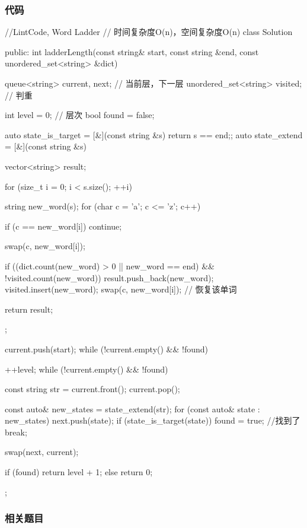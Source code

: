 \subsubsection{代码}
\begin{Code}
//LintCode, Word Ladder
// 时间复杂度O(n)，空间复杂度O(n)
class Solution {
public:
    int ladderLength(const string& start, const string &end,
            const unordered_set<string> &dict) {
        queue<string> current, next;    // 当前层，下一层
        unordered_set<string> visited;  // 判重

        int level = 0;  // 层次
        bool found = false;

        auto state_is_target = [&](const string &s) {return s == end;};
        auto state_extend = [&](const string &s) {
            vector<string> result;

            for (size_t i = 0; i < s.size(); ++i) {
                string new_word(s);
                for (char c = 'a'; c <= 'z'; c++) {
                    if (c == new_word[i]) continue;

                    swap(c, new_word[i]);

                    if ((dict.count(new_word) > 0 || new_word == end) &&
                            !visited.count(new_word)) {
                        result.push_back(new_word);
                        visited.insert(new_word);
                    }
                    swap(c, new_word[i]); // 恢复该单词
                }
            }

            return result;
        };

        current.push(start);
        while (!current.empty() && !found) {
            ++level;
            while (!current.empty() && !found) {
                const string str = current.front();
                current.pop();

                const auto& new_states = state_extend(str);
                for (const auto& state : new_states) {
                    next.push(state);
                    if (state_is_target(state)) {
                        found = true; //找到了
                        break;
                    }
                }
            }
            swap(next, current);
        }
        if (found) return level + 1;
        else return 0;
    }
};
\end{Code}


\subsubsection{相关题目}

